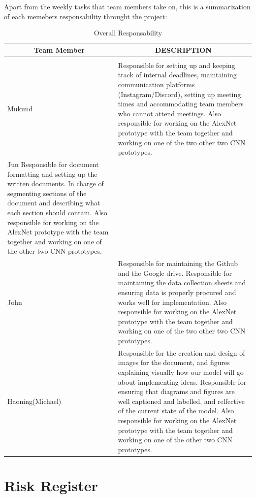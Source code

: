 \documentclass{article} %
\begin{document}
Apart from the weekly tasks that team members take on, this is a summarization of each memebers responsability throught the project:
\begin{table}[t]
\caption{Overall Responsability}
\label{sample-table}
\begin{center}
\begin{tabular}{ll}
\multicolumn{1}{c}{\bf Team Member}  &\multicolumn{1}{c}{\bf DESCRIPTION}
\\ \hline \\
Mukund           &Responsible for setting up and keeping track of internal deadlines, maintaining communication platforms (Instagram/Discord), setting up meeting times and accommodating team members who cannot attend meetings. Also responsible for working on the AlexNet prototype with the team together and working on one of the two other two CNN prototypes.\\
                 
Jun              Responsible for document formatting and setting up the written documents. In charge of segmenting sections of the document and describing what each section should contain. Also responsible for working on the AlexNet prototype with the team together and working on one of the other two CNN prototypes. \\

John             &Responsible for maintaining the Github and the Google drive. Responsible for maintaining the data collection sheets and ensuring data is properly  procured and works well for implementation. Also responsible for working on the AlexNet prototype with the team together and working on one of the two other two CNN prototypes.\\

Haoning(Michael) &Responsible for the creation and design of images for the document, and figures explaining visually how our model will go about implementing ideas.   Responsible for ensuring that diagrams and figures are well captioned and labelled, and relfective of the current state of the model. Also responsible for working on the AlexNet prototype with the team together and working on one of the other two CNN prototypes. \\

\end{tabular}
\end{center}
\end{table}

\section {Risk Register}
\end{document}
